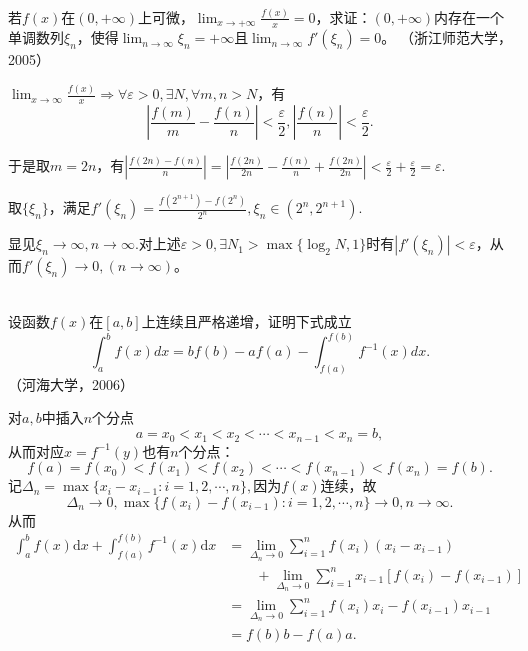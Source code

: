   \begin{example}
  \hfill\\
  若$f(x)$在$(0,+\infty)$上可微，$\displaystyle\lim_{x\rightarrow+\infty}\frac{f(x)}x=0$，求证：$(0,+\infty)$内存在一个单调数列${\xi_n}$，使得$\displaystyle\lim_{n\rightarrow\infty}\xi_n=+\infty$且$\displaystyle\lim_{n\rightarrow\infty}f'(\xi_n)=0$。 （浙江师范大学，2005）
  
  
  $\lim_{x\rightarrow\infty}\frac{f(x)}{x}\Longrightarrow\forall\varepsilon>0,\exists N,\forall m,n>N$，有$$|\frac{f(m)}{m}-\frac{f(n)}{n}|<\frac{\varepsilon}{2},|\frac{f(n)}n|<\frac{\varepsilon}{2}.$$
  
  于是取$m=2n$，有$|\frac{f(2n)-f(n)}{n}|=|\frac{f(2n)}{2n}-\frac{f(n)}{n}+\frac{f(2n)}{2n}|<\frac{\varepsilon}{2}+\frac{\varepsilon}{2}=\varepsilon.$
  
  取$\{\xi_n\}$，满足$f'(\xi_n)=\frac{f(2^{n+1})-f(2^n)}{2^n},\xi_n\in(2^n,2^{n+1}).$
  
  显见$\xi_n\rightarrow\infty,n\rightarrow\infty.$对上述$\varepsilon>0,\exists N_1>\max\{\log_2N,1\}$时有$|f'(\xi_n)|<\varepsilon$，从而$f'(\xi_n)\rightarrow0,(n\rightarrow\infty)$。
  \end{example}
  \begin{example}
  \hfill\\
  设函数$f(x)$在$[a,b]$上连续且严格递增，证明下式成立$$\int_a^bf(x)dx=bf(b)-af(a)-\int_{f(a)}^{f(b)}f^{-1}(x)dx.$$（河海大学，2006）

对$a,b$中插入$n$个分点$$a=x_0<x_1<x_2<\cdots<x_{n-1}<x_n=b,$$
从而对应$x=f^{-1}(y)$也有$n$个分点：
$$f(a)=f(x_0)<f(x_1)<f(x_2)<\cdots<f(x_{n-1})<f(x_n)=f(b).$$
记$\Delta_n=\max\{x_i-x_{i-1}:i=1,2,\cdots,n\},$因为$f(x)$连续，故
$$\Delta_n\rightarrow0,\max\{f(x_i)-f(x_{i-1}):i=1,2,\cdots,n\}\rightarrow0,n\rightarrow\infty.$$
从而
\begin{align*}
\int_a^bf(x)\mathrm{d}x+\int_{f(a)}^{f(b)}f^{-1}(x)\mathrm{d}x&=\lim_{\Delta_n\rightarrow0}\sum_{i=1}^nf(x_i)(x_i-x_{i-1})\\
&\qquad+\lim_{\Delta_n\rightarrow0}\sum_{i=1}^nx_{i-1}[f(x_i)-f(x_{i-1})]\\
&=\lim_{\Delta_n\rightarrow0}\sum_{i=1}^nf(x_i)x_i-f(x_{i-1})x_{i-1}\\
&=f(b)b-f(a)a.\\
\end{align*}
\end{example}
